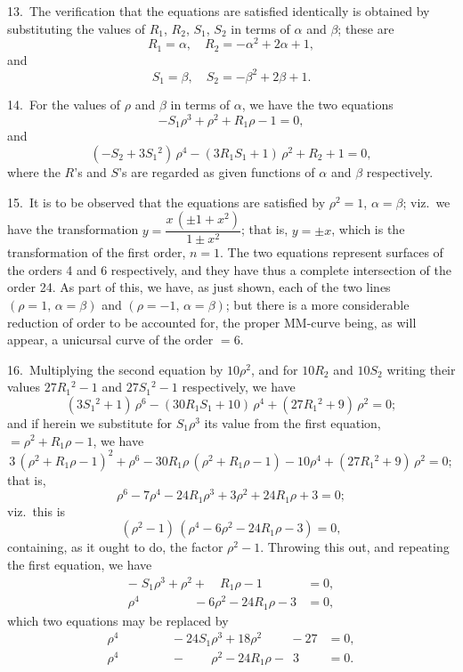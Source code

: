 \documentclass[11pt,a4paper]{book}
\begin{document}
13.\ The verification that the equations are satisfied identically is obtained by
substituting the values of $R_1$, $R_2$, $S_1$, $S_2$ in terms of $\alpha$ and $\beta$; these are
\[
R_1 = \alpha, \quad R_2 = -\alpha^2 + 2\alpha + 1,
\]
and
\[
S_1 = \beta, \quad S_2 = -\beta^2 + 2\beta + 1.
\]

14.\ For the values of $\rho$ and $\beta$ in terms of $\alpha$, we have the two equations
\[
-S_1 \rho^3 + \rho^2 + R_1 \rho - 1 = 0,
\]
and
\[
(-S_2 + 3S_1{}^2)\, \rho^4 - (3R_1 S_1 + 1)\, \rho^2 + R_2 + 1 = 0,
\]
where the $R$'s and $S$'s are regarded as given functions of $\alpha$ and $\beta$ respectively.

15.\ It is to be observed that the equations are satisfied by $\rho^2 = 1$, $\alpha = \beta$; viz.\ we
have the transformation $y = \dfrac{x\, (\pm 1 + x^2)}{1 \pm x^2}$; that is, $y = \pm x$, which is the transformation
of the first order, $n = 1$. The two equations represent surfaces of the orders 4 and 6
respectively, and they have thus a complete intersection of the order 24. As part of
this, we have, as just shown, each of the two lines $(\rho = 1,\, \alpha = \beta)$ and $(\rho = -1,\, \alpha = \beta)$;
but there is a more considerable reduction of order to be accounted for, the proper
MM-curve being, as will appear, a unicursal curve of the order $= 6$.

16.\ Multiplying the second equation by $10\rho^2$, and for $10R_2$ and $10S_2$ writing their
values $27R_1{}^2 - 1$ and $27S_1{}^2 - 1$ respectively, we have
\[
(3S_1{}^2 + 1)\, \rho^6 - (30R_1 S_1 + 10)\, \rho^4 + (27R_1{}^2 + 9)\, \rho^2 = 0;
\]
and if herein we substitute for $S_1 \rho^3$ its value from the first equation, $= \rho^2 + R_1 \rho - 1$,
we have
\[
3\, (\rho^2 + R_1 \rho - 1)^2 + \rho^6 - 30R_1 \rho\, (\rho^2 + R_1 \rho - 1) - 10\rho^4 + (27R_1{}^2 + 9)\, \rho^2 = 0;
\]
that is,
\[
\rho^6 - 7\rho^4 - 24R_1 \rho^3 + 3\rho^2 + 24R_1 \rho + 3 = 0;
\]
viz.\ this is
\[
(\rho^2 - 1)\, (\rho^4 - 6\rho^2 - 24R_1 \rho - 3) = 0,
\]
containing, as it ought to do, the factor $\rho^2 - 1$. Throwing this out, and repeating the
first equation, we have
\[
\begin{aligned}
-\; S_1 \rho^3 + \rho^2 + \phantom{24}R_1 \rho - 1 &= 0,\\
\rho^4 \phantom{{} - 24R_1 \rho^3} - 6\rho^2 - 24R_1 \rho - 3 &= 0,
\end{aligned}
\]
which two equations may be replaced by
\[
\begin{aligned}
\rho^4 \phantom{{} - 24S_1 \rho^3} - 24S_1 \rho^3 + 18\rho^2 \phantom{{} - 27} - 27 &= 0,\\
\rho^4 \phantom{{} - 24S_1 \rho^3} - \phantom{24S_1} \rho^2 - 24R_1 \rho - \phantom{2} 3 &= 0.
\end{aligned}
\]
\end{document}
